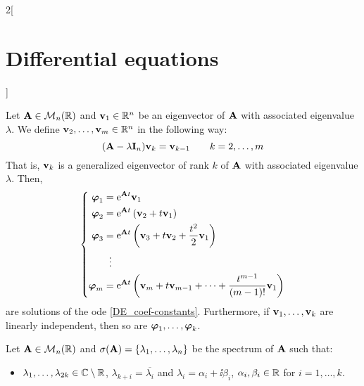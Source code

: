 \documentclass[../../../main.tex]{subfiles}
\begin{document}
\begin{multicols}{2}[\section{Differential equations}]
\begin{definition}
  \end{definition}
  \begin{lemma}
    Let $\boldsymbol{\mathrm{A}}\in\mathcal{M}_n(\mathbb{R})$ and $\boldsymbol{\mathrm{v}}_1\in\mathbb{R}^n$ be an eigenvector of $\boldsymbol{\mathrm{A}}$ with associated eigenvalue $\lambda$. We define $\boldsymbol{\mathrm{v}}_2,\ldots,\boldsymbol{\mathrm{v}}_m\in\mathbb{R}^n$ in the following way: $$(\boldsymbol{\mathrm{A}}-\lambda\boldsymbol{\mathrm{I}}_n)\boldsymbol{\mathrm{v}}_k=\boldsymbol{\mathrm{v}}_{k-1}\qquad k=2,\ldots, m$$
    That is, $\boldsymbol{\mathrm{v}}_k$ is a generalized eigenvector of rank $k$ of $\boldsymbol{\mathrm{A}}$ with associated eigenvalue $\lambda$. Then,
    $$
      \left\{
      \begin{aligned}
        \boldsymbol{\mathrm{\varphi}}_1 & =\mathrm{e}^{\boldsymbol{\mathrm{A}}t}\boldsymbol{\mathrm{v}}_1                                                                                          \\
        \boldsymbol{\mathrm{\varphi}}_2 & =\mathrm{e}^{\boldsymbol{\mathrm{A}}t}\left(\boldsymbol{\mathrm{v}}_2+t\boldsymbol{\mathrm{v}}_1\right)                                                       \\
        \boldsymbol{\mathrm{\varphi}}_3 & =\mathrm{e}^{\boldsymbol{\mathrm{A}}t}\left(\boldsymbol{\mathrm{v}}_3+t\boldsymbol{\mathrm{v}}_2+\frac{t^2}{2}\boldsymbol{\mathrm{v}}_1\right)                     \\
                                   & \;\;\vdots                                                                                                                              \\
        \boldsymbol{\mathrm{\varphi}}_m & =\mathrm{e}^{\boldsymbol{\mathrm{A}}t}\left(\boldsymbol{\mathrm{v}}_m+t\boldsymbol{\mathrm{v}}_{m-1}+\cdots+\frac{t^{m-1}}{(m-1)!}\boldsymbol{\mathrm{v}}_1\right) \\
      \end{aligned}
      \right.
    $$
    are solutions of the ode \eqref{DE_coef-constants}. Furthermore, if $\boldsymbol{\mathrm{v}}_1,\ldots,\boldsymbol{\mathrm{v}}_k$ are linearly independent, then so are $\boldsymbol{\mathrm{\varphi}}_1,\ldots,\boldsymbol{\mathrm{\varphi}}_k$.
  \end{lemma}
  \begin{corollary}
    Let $\boldsymbol{\mathrm{A}}\in\mathcal{M}_n(\mathbb{R})$ and $\sigma(\boldsymbol{\mathrm{A}})=\{\lambda_1,\ldots,\lambda_n\}$ be the spectrum of $\boldsymbol{\mathrm{A}}$ such that:
    \begin{itemize}
      \item $\lambda_1,\ldots,\lambda_{2k}\in\mathbb{C}\setminus\mathbb{R}$, $\lambda_{k+i}=\overline{\lambda_i}$ and $\lambda_i=\alpha_i+\ii\beta_i$, $\alpha_i,\beta_i\in\mathbb{R}$ for $i=1,\ldots,k$.

\end{itemize}
\end{corollary}
\end{multicols}
\end{document}
